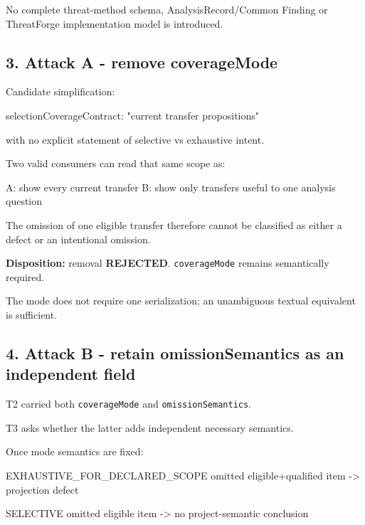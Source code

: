 \documentclass[
  11pt,
  a4paper,
]{article}
\newenvironment{Shaded}{}{}
\newcommand{\NormalTok}[1]{#1}
\begin{document}
No complete threat-method schema, AnalysisRecord/Common Finding or
ThreatForge implementation model is introduced.

\subsection{3. Attack A - remove
coverageMode}\label{attack-a---remove-coveragemode}

Candidate simplification:

\begin{Shaded}
\begin{Highlighting}[]
\NormalTok{selectionCoverageContract:}
\NormalTok{  "current transfer propositions"}
\end{Highlighting}
\end{Shaded}

with no explicit statement of selective vs exhaustive intent.

Two valid consumers can read that same scope as:

\begin{Shaded}
\begin{Highlighting}[]
\NormalTok{A: show every current transfer}
\NormalTok{B: show only transfers useful to one analysis question}
\end{Highlighting}
\end{Shaded}

The omission of one eligible transfer therefore cannot be classified as
either a defect or an intentional omission.

\textbf{Disposition:} removal \textbf{REJECTED}. \texttt{coverageMode}
remains semantically required.

The mode does not require one serialization; an unambiguous textual
equivalent is sufficient.

\subsection{4. Attack B - retain omissionSemantics as an independent
field}\label{attack-b---retain-omissionsemantics-as-an-independent-field}

T2 carried both \texttt{coverageMode} and \texttt{omissionSemantics}.

T3 asks whether the latter adds independent necessary semantics.

Once mode semantics are fixed:

\begin{Shaded}
\begin{Highlighting}[]
\NormalTok{EXHAUSTIVE\_FOR\_DECLARED\_SCOPE}
\NormalTok{  omitted eligible+qualified item {-}\textgreater{} projection defect}

\NormalTok{SELECTIVE}
\NormalTok{  omitted eligible item {-}\textgreater{} no project{-}semantic conclusion}
\end{Highlighting}
\end{Shaded}
\end{document}
